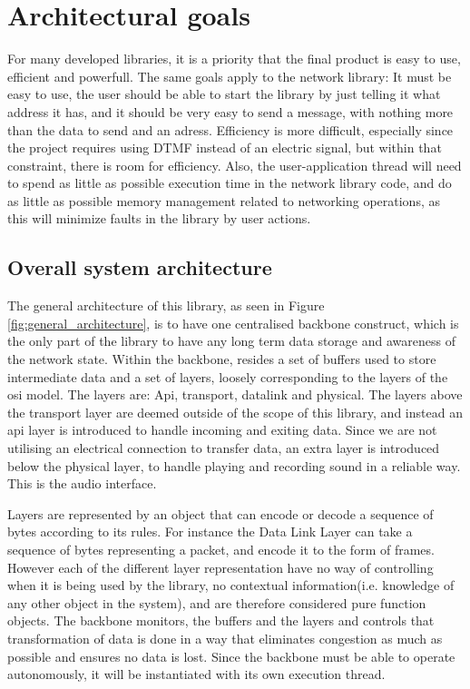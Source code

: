 \section{Architectural goals}
For many developed libraries, it is a priority that the final product is easy to use, efficient and powerfull.  The same goals apply to the network library: It must be easy to use, the user should be able to start the library by just telling it what address it has, and it should be very easy to send a message, with nothing more than the data to send and an adress. Efficiency is more difficult, especially since the project requires using DTMF instead of an electric signal, but within that constraint, there is room for efficiency.
Also, the user-application thread will need to spend as little as possible execution time in the network library code, and do as little as possible memory management related to networking operations, as this will minimize faults in the library by user actions.



\subsection{Overall system architecture}
The general architecture of this library, as seen in Figure \ref{fig:general_architecture}, is to have one centralised backbone construct, which is the only part of the library to have any long term data storage and awareness of the network state. 
Within the backbone, resides a set of buffers used to store intermediate data and a set of layers, loosely corresponding to the layers of the osi model.
The layers are: Api, transport, datalink and physical.
The layers above the transport layer are deemed outside of the scope of this library, and instead an api layer is introduced to handle incoming and exiting data. Since we are not utilising an electrical connection to transfer data, an extra layer is introduced below the physical layer, to handle playing and recording sound in a reliable way. This is the audio interface.









Layers are represented by an object that can encode or decode a sequence of bytes according to its rules. For instance the Data Link Layer can take a sequence of bytes representing a packet, and encode it to the form of frames.
However each of the different layer representation have no way of controlling when it is being used by the library, no contextual information(i.e. knowledge of any other object in the system), and are therefore considered pure function objects.
The backbone monitors, the buffers and the layers and controls that transformation of data is done in a way that eliminates congestion as much as possible and ensures no data is lost. Since the backbone must be able to operate autonomously, it will be instantiated with its own execution thread. 

